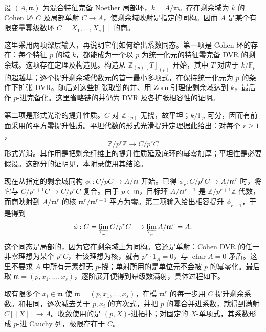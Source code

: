 \begin{theorem}[混合特征的系数环]\label{b3:thm:mixed-characteristic-coefficient-ring}
	设 \((A,\mathfrak m)\) 为混合特征完备 Noether 局部环，\(k=A/\mathfrak m\)。存在剩余域为 \(k\) 的 Cohen 环 \(C\) 及局部单射 \(C\to A\)，使剩余域映射是指定的同构。因而 \(A\) 是某个有限变量幂级数环 \(C[\![X_1,\ldots,X_s]\!]\) 的商。
\end{theorem}

\begin{proofsketch}
	这里采用两项深层输入，再说明它们如何给出系数同态。第一项是 Cohen 环的存在：每个特征 \(p\) 的域 \(k\)，都能成为一个以 \(p\) 为统一化元的特征零完备 DVR 的剩余域。这项存在定理及构造见\cite[Theorem 29.1, pp. 223--224]{Matsumura1989CommutativeRingTheory}。构造从 \(\mathbb Z_{(p)}[T]_{(p)}\) 开始，其中 \(T\) 对应于 \(k/\mathbb F_p\) 的超越基；逐个提升剩余域代数元的首一最小多项式，在保持统一化元为 \(p\) 的条件下扩张 DVR。随后对这些扩张取链的并、用 Zorn 引理使剩余域达到 \(k\)，最后作 \(p\)-进完备化。这里省略链的并仍为 DVR 及各扩张相容性的证明。

	第二项是形式光滑的提升性质。\(C\) 对 \(\mathbb Z_{(p)}\) 无挠，故平坦；\(k/\mathbb F_p\) 可分，因而有前面采用的平方零提升性质。平坦代数的形式光滑提升定理据此给出：对每个 \(r\ge1\)，
	\[
		\mathbb Z/p^r\mathbb Z\longrightarrow C/p^rC
	\]
	形式光滑。其作用是把剩余纤维上的提升性质延及底环的幂零加厚；平坦性是必要假设。这部分的证明见\cite[Theorem 28.10, pp. 222--223; Theorem 29.2, pp. 224--225]{Matsumura1989CommutativeRingTheory}，本附录使用其结论。

	现在从指定的剩余域同构 \(\phi_1:C/pC\to A/\mathfrak m\) 开始。已得 \(\phi_r:C/p^rC\to A/\mathfrak m^r\) 时，将它与 \(C/p^{r+1}C\to C/p^rC\) 复合。由于 \(p\in\mathfrak m\)，目标环 \(A/\mathfrak m^{r+1}\) 是 \(\mathbb Z/p^{r+1}\mathbb Z\)-代数，而商映射到 \(A/\mathfrak m^r\) 的核 \(\mathfrak m^r/\mathfrak m^{r+1}\) 平方为零。第二项输入给出相容提升 \(\phi_{r+1}\)，于是得到
	\[
		\phi:C=\varprojlim_r C/p^rC \longrightarrow\varprojlim_r A/\mathfrak m^r=A.
	\]
	这个同态是局部的，因为它在剩余域上为同构。它还是单射：Cohen DVR 的任一非零理想为某个 \(p^rC\)，若该理想为核，就有 \(p^r\cdot1_A=0\)，与 \(\operatorname{char}A=0\) 矛盾。这里不要求 \(A\) 中所有元素都无 \(p\)-挠；单射所用的是单位元不会被 \(p\) 的幂零化。最后取 \(\mathfrak m=(p,x_1,\ldots,x_s)\)，逐阶展开便得到幂级数满射，具体过程如下。
\end{proofsketch}

取有限多个 \(x_i\in\mathfrak m\) 使 \(\mathfrak m=(p,x_1,\ldots,x_s)\)，在模 \(\mathfrak m^r\) 的每一步用 \(C\) 提升剩余系数。和相同，逐次减去关于 \(p,x_i\) 的齐次式，并把 \(p\) 的幂合并进系数，就得到满射 \(C[\![X]\!]\to A\)。收敛使用的是 \((p,X)\)-进拓扑；对固定的 \(X\)-单项式，其系数形成 \(p\)-进 Cauchy 列，极限存在于 \(C\)。

